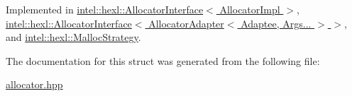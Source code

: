 Implemented in \hyperlink{structintel_1_1hexl_1_1AllocatorInterface_a2684feec3b8f3cfba626b46912b4cec5}{intel\+::hexl\+::\+Allocator\+Interface$<$ Allocator\+Impl $>$}, \hyperlink{structintel_1_1hexl_1_1AllocatorInterface_a2684feec3b8f3cfba626b46912b4cec5}{intel\+::hexl\+::\+Allocator\+Interface$<$ Allocator\+Adapter$<$ Adaptee, Args... $>$ $>$}, and \hyperlink{structintel_1_1hexl_1_1MallocStrategy_af45ff5d0c9b1e867fac481f447a4569c}{intel\+::hexl\+::\+Malloc\+Strategy}.



The documentation for this struct was generated from the following file\+:\begin{DoxyCompactItemize}
\item 
\hyperlink{allocator_8hpp}{allocator.\+hpp}\end{DoxyCompactItemize}
